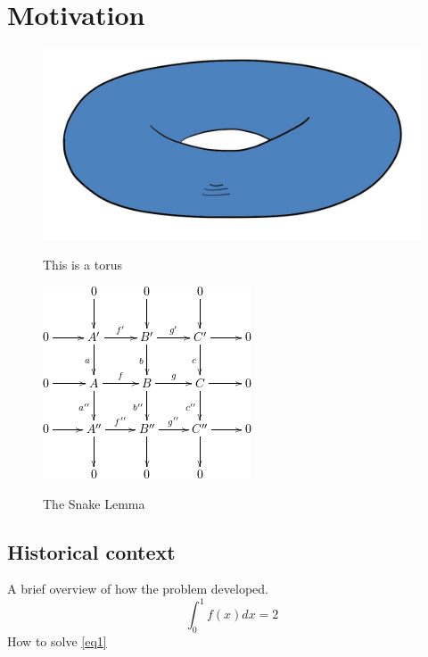 \documentclass[12pt,reqno]{amsbook}
\theoremstyle{definition}
\begin{document}
\section{Motivation}


\begin{figure}\label{fig1}
\includegraphics[alt="Description of Image that serves the same purpose",scale=0.3]{torus.jpg}
\caption{This is a torus}
\end{figure}



\begin{figure}\label{fig2}
\includegraphics[alt="Description of Image that serves the same purpose",scale=0.8]{figure.png}
\caption{The Snake Lemma}
\end{figure}


\subsection{Historical context}
A brief overview of how the problem developed.
\begin{equation}\label{eq1}\int_0^1 f(x) dx = 2\end{equation}
How to solve \eqref{eq1}
\end{document}
